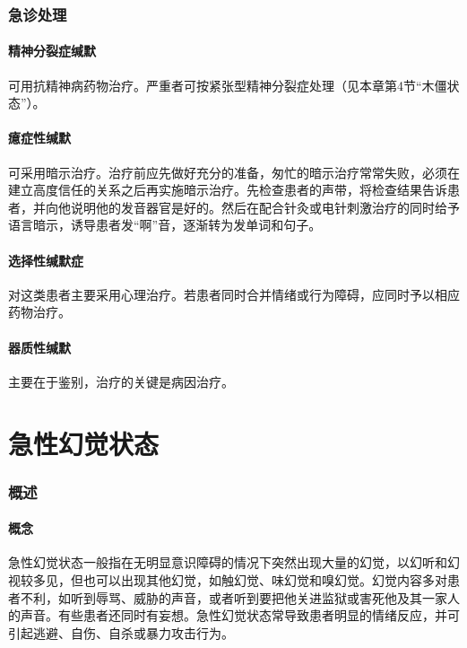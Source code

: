 \subsubsection{急诊处理}

\paragraph{精神分裂症缄默}

可用抗精神病药物治疗。严重者可按紧张型精神分裂症处理（见本章第4节“木僵状态”）。

\paragraph{癔症性缄默}

可采用暗示治疗。治疗前应先做好充分的准备，匆忙的暗示治疗常常失败，必须在建立高度信任的关系之后再实施暗示治疗。先检查患者的声带，将检查结果告诉患者，并向他说明他的发音器官是好的。然后在配合针灸或电针刺激治疗的同时给予语言暗示，诱导患者发“啊”音，逐渐转为发单词和句子。

\paragraph{选择性缄默症}

对这类患者主要采用心理治疗。若患者同时合并情绪或行为障碍，应同时予以相应药物治疗。

\paragraph{器质性缄默}

主要在于鉴别，治疗的关键是病因治疗。

\protect\hypertarget{text00048.html}{}{}

\section{急性幻觉状态}

\subsubsection{概述}

\paragraph{概念}

急性幻觉状态一般指在无明显意识障碍的情况下突然出现大量的幻觉，以幻听和幻视较多见，但也可以出现其他幻觉，如触幻觉、味幻觉和嗅幻觉。幻觉内容多对患者不利，如听到辱骂、威胁的声音，或者听到要把他关进监狱或害死他及其一家人的声音。有些患者还同时有妄想。急性幻觉状态常导致患者明显的情绪反应，并可引起逃避、自伤、自杀或暴力攻击行为。

